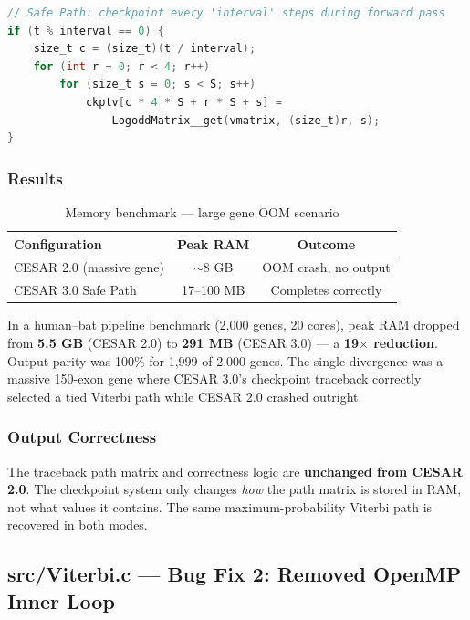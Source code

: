 \documentclass[12pt,a4paper]{article}
\begin{document}
\begin{lstlisting}[language=C]
// Safe Path: checkpoint every 'interval' steps during forward pass
if (t % interval == 0) {
    size_t c = (size_t)(t / interval);
    for (int r = 0; r < 4; r++)
        for (size_t s = 0; s < S; s++)
            ckptv[c * 4 * S + r * S + s] =
                LogoddMatrix__get(vmatrix, (size_t)r, s);
}
\end{lstlisting}

\subsubsection{Results}

\begin{table}[h!]
\centering
\caption{Memory benchmark --- large gene OOM scenario}
\label{tab:memory}
\begin{tabular}{lcc}
\toprule
\textbf{Configuration} & \textbf{Peak RAM} & \textbf{Outcome} \\
\midrule
CESAR 2.0 (massive gene) & $\sim$8 GB  & OOM crash, no output \\
CESAR 3.0 Safe Path      & 17--100 MB  & Completes correctly  \\
\bottomrule
\end{tabular}
\end{table}

In a human--bat pipeline benchmark (2,000 genes, 20 cores), peak RAM dropped from
\textbf{5.5 GB} (CESAR 2.0) to \textbf{291 MB} (CESAR 3.0) --- a \textbf{19$\times$
reduction}. Output parity was 100\% for 1,999 of 2,000 genes. The single divergence was
a massive 150-exon gene where CESAR 3.0's checkpoint traceback correctly selected a
tied Viterbi path while CESAR 2.0 crashed outright.

\subsubsection{Output Correctness}

The traceback path matrix and correctness logic are \textbf{unchanged from CESAR 2.0}.
The checkpoint system only changes \textit{how} the path matrix is stored in RAM, not
what values it contains. The same maximum-probability Viterbi path is recovered in both
modes.


\subsection{src/Viterbi.c --- Bug Fix 2: Removed OpenMP Inner Loop}
\end{document}
